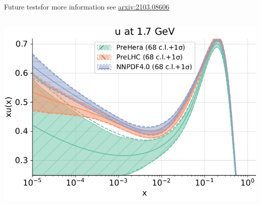 \begin{frame}{Future tests}{for more information see \href{https://arxiv.org/pdf/2103.08606.pdf}{\color{blue} arxiv:2103.08606}}
\begin{columns}
        \includegraphics[width=1.0\textwidth]{juan_future_hyperopt/diffu}

    \end{columns}
\end{frame}
